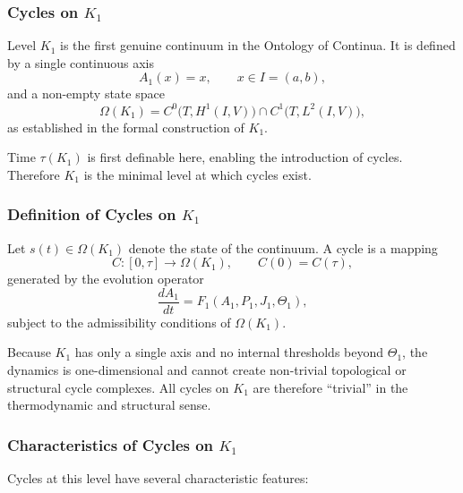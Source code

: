 
\subsubsection{Cycles on \texorpdfstring{$K_1$}{K_1}}
\label{sec:cycles-k1}

Level $K_1$ is the first genuine continuum in the Ontology of
Continua.
It is defined by a single continuous axis
\[
  A_1(x)=x, \qquad x\in I=(a,b),
\]
and a non-empty state space
\[
  \Omega(K_1)
  = C^0\!\bigl(T, H^1(I,V)\bigr)
    \cap C^1\!\bigl(T, L^2(I,V)\bigr),
\]
as established in the formal construction of $K_1$.

Time $\tau(K_1)$ is first definable here, enabling the introduction of
cycles.
Therefore $K_1$ is the minimal level at which cycles exist.

\subsubsection{Definition of Cycles on \texorpdfstring{$K_1$}{K_1}}

Let $s(t)\in\Omega(K_1)$ denote the state of the continuum.
A cycle is a mapping
\[
  C:[0,\tau]\to\Omega(K_1), \qquad
  C(0)=C(\tau),
\]
generated by the evolution operator
\[
  \frac{dA_1}{dt} = F_1(A_1,P_1,J_1,\Theta_1),
\]
subject to the admissibility conditions of $\Omega(K_1)$.

Because $K_1$ has only a single axis and no internal thresholds beyond
$\Theta_1$, the dynamics is one-dimensional and cannot create
non-trivial topological or structural cycle complexes.
All cycles on $K_1$ are therefore ``trivial'' in the thermodynamic and
structural sense.

\subsubsection{Characteristics of Cycles on \texorpdfstring{$K_1$}{K_1}}

Cycles at this level have several characteristic features:

